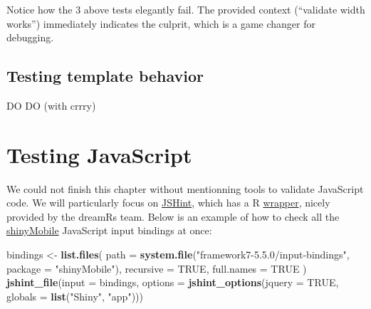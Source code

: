 \documentclass[
]{book}
\newenvironment{Shaded}{\begin{snugshade}}{\end{snugshade}}
\newcommand{\DataTypeTok}[1]{\textcolor[rgb]{0.13,0.29,0.53}{#1}}
\newcommand{\KeywordTok}[1]{\textcolor[rgb]{0.13,0.29,0.53}{\textbf{#1}}}
\newcommand{\NormalTok}[1]{#1}
\newcommand{\OtherTok}[1]{\textcolor[rgb]{0.56,0.35,0.01}{#1}}
\newcommand{\StringTok}[1]{\textcolor[rgb]{0.31,0.60,0.02}{#1}}
\begin{document}
Notice how the 3 above tests elegantly fail. The provided context (``validate width works'') immediately indicates the culprit, which is a game changer for debugging.

\hypertarget{testing-template-behavior}{%
\subsection{Testing template behavior}\label{testing-template-behavior}}

DO DO (with crrry)

\hypertarget{testing-javascript}{%
\section{Testing JavaScript}\label{testing-javascript}}

We could not finish this chapter without mentionning tools to validate JavaScript code. We will particularly focus on \href{https://jshint.com}{JSHint}, which has a R \href{https://github.com/dreamRs/jstools}{wrapper}, nicely provided by the dreamRs team. Below is an example of how to check all the \href{https://github.com/RinteRface/shinyMobile}{shinyMobile} JavaScript input bindings at once:

\begin{Shaded}
\begin{Highlighting}[]
\NormalTok{bindings <-}\StringTok{ }\KeywordTok{list.files}\NormalTok{(}
  \DataTypeTok{path =} \KeywordTok{system.file}\NormalTok{(}\StringTok{"framework7-5.5.0/input-bindings"}\NormalTok{, }\DataTypeTok{package =} \StringTok{"shinyMobile"}\NormalTok{),}
  \DataTypeTok{recursive =} \OtherTok{TRUE}\NormalTok{,}
  \DataTypeTok{full.names =} \OtherTok{TRUE}
\NormalTok{)}
\KeywordTok{jshint_file}\NormalTok{(}\DataTypeTok{input =}\NormalTok{ bindings, }\DataTypeTok{options =} \KeywordTok{jshint_options}\NormalTok{(}\DataTypeTok{jquery =} \OtherTok{TRUE}\NormalTok{, }\DataTypeTok{globals =} \KeywordTok{list}\NormalTok{(}\StringTok{"Shiny"}\NormalTok{, }\StringTok{"app"}\NormalTok{)))}
\end{Highlighting}
\end{Shaded}
\end{document}
